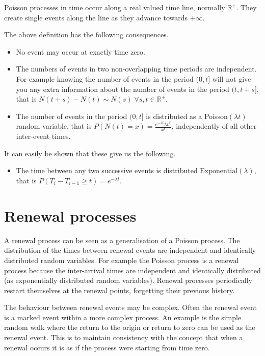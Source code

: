 Poisson processes in time occur along a real valued time line,
normally ${\mathbb R}^+$.  They create single events along the line as they
advance towards $+\infty$.

The above definition has the following consequences.

\begin{itemize}
\item	No event may occur at exactly time zero.

\item	The numbers of events in two non-overlapping time periods are
independent.  For example knowing the number of events in the period
$(0, t]$ will not give you any extra information about the number of
events in the period $(t, t+s]$, that is $N(t+s) - N(t) \sim N(s) \;
\forall s,t \in {\mathbb R}^+$.

\item	The number of events in the period $(0, t]$ is distributed
as a Poisson$(\lambda t)$ random variable, that is $P(N(t) = x) =
\frac{e^{-\lambda t}{\lambda t}^x}{x!}$, independently of all other
inter-event times.

\end{itemize}

It can easily be shown that these give us the following.

\begin{itemize}
\item	The time between any two successive events is distributed
$\mbox{Exponential}(\lambda)$, that is $P(T_i - T_{i-1} \geq t) =
e^{-\lambda t}$.

\end{itemize}

\section{Renewal processes}

A renewal process can be seen as a generalisation of a Poisson
process.  The distribution of the times between renewal events are
independent and identically distributed random variables.  For example
the Poisson process is a renewal process because the inter-arrival
times are independent and identically distributed (as exponentially
distributed random variables).  Renewal processes periodically
restart themselves at the renewal points, forgetting their previous
history.

The behaviour between renewal events may be complex.  Often the
renewal event is a marked event within a more complex process.  An
example is the simple random walk where the return to the origin or
return to zero can be used as the renewal event.  This is to maintain
consistency with the concept that when a renewal occurs it is as if
the process were starting from time zero.

